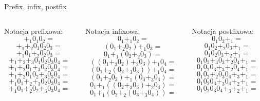 \begin{frame}{Prefix, infix, postfix}
    \begin{columns}
        \begin{column}{0.3\textwidth}
            Notacja prefixowa:
            \[ +_1 0_1 0_2 = \]
            \[ +_1 +_2 0_1 0_2 0_3 = \]
            \[ +_1 0_1 +_2 0_2 0_3 = \]
            \[ +_1 +_2 +_3 0_1 0_2 0_3 0_4 = \]
            \[ +_1 +_2 0_1 +_3 0_2 0_3 0_4 = \]
            \[ +_1 +_2 0_1 0_2 +_3 0_3 0_4 = \]
            \[ +_1 0_1 +_2 +_3 0_2 0_3 0_4 = \]
            \[ +_1 0_1 +_2 0_2 +_3 0_3 0_4 = \]
        \end{column}
        \begin{column}{0.4\textwidth}
            Notacja infixowa:
            \[ 0_1 +_1 0_2 = \]
            \[ ( 0_1 +_2 0_2 ) +_1 0_3 = \]
            \[ 0_1 +_1 ( 0_2 +_2 0_3 ) = \]
            \[ ( ( 0_1 +_3 0_2 ) +_2 0_3 ) +_1 0_4 = \]
            \[ ( 0_1 +_2 ( 0_2 +_3 0_3 ) ) +_1 0_4 = \]
            \[ ( 0_1 +_2 0_2 ) +_1 ( 0_3 +_3 0_4 ) = \]
            \[ 0_1 +_1 ( ( 0_2 +_3 0_3 ) +_2 0_4 ) = \]
            \[ 0_1 +_1 ( 0_2 +_2 ( 0_3 +_3 0_4 ) ) = \]
        \end{column}
        \begin{column}{0.3\textwidth}
            Notacja postfixowa:
            \[ 0_1 0_2 +_1 = \]
            \[ 0_1 0_2 +_2 0_3 +_1 = \]
            \[ 0_1 0_2 0_3 +_2 +_1 = \]
            \[ 0_1 0_2 +_3 0_3 +_2 0_4 +_1 = \]
            \[ 0_1 0_2 0_3 +_3 +_2 0_4 +_1 = \]
            \[ 0_1 0_2 +_2 0_3 0_4 +_3 +_1 = \]
            \[ 0_1 0_2 0_3 +_3 0_4 +_2 +_1 = \]
            \[ 0_1 0_2 0_3 0_4 +_3 +_2 +_1 = \]
        \end{column}
    \end{columns}
\end{frame}

